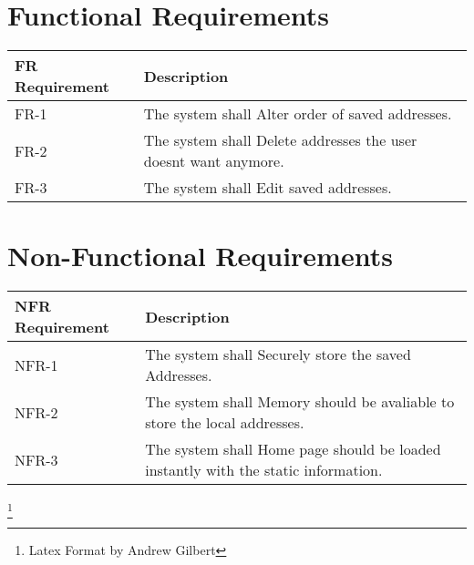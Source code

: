 \documentclass{article}
\newcommand{\requirement}[1]{The system shall #1.}
\begin{document}
\section{Functional Requirements}
\begin{tabu}{lX}
  \toprule
  FR Requirement & Description\\
  \midrule
  FR-1 & \requirement{Alter order of saved addresses}\\
  FR-2 & \requirement{Delete addresses the user doesnt want anymore}\\
  FR-3 & \requirement{Edit saved addresses}\\
  \bottomrule
\end{tabu}
\section{Non-Functional Requirements}
\begin{tabu}{lX}
  \toprule
  NFR Requirement & Description\\
  \midrule
  NFR-1 & \requirement{Securely store the saved Addresses}\\
  NFR-2 & \requirement{Memory should be avaliable to store the local addresses}\\
  NFR-3 & \requirement{Home page should be loaded instantly with the static information}\\
  \bottomrule
\end{tabu}

\footnote{Latex Format by Andrew Gilbert}
\end{document}
